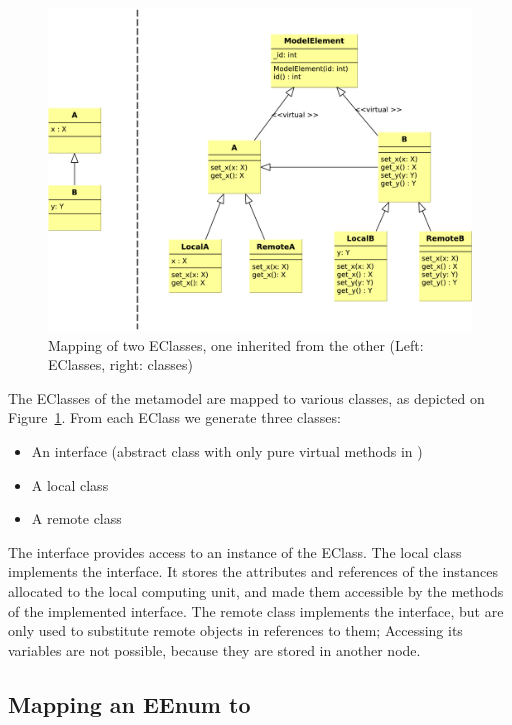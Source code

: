 \begin{figure}
	\begin{center}
		\includegraphics[width=\textwidth]{figures/eclass-to-cpp.pdf}
		\caption{Mapping of two EClasses, one inherited from the other (Left: EClasses, right: \protect\cpp{} classes) }
		\label{fig:eclass-to-cpp}
	\end{center}
\end{figure}


The EClasses of the metamodel are mapped to various \cpp{} classes, as depicted on \mbox{Figure~\ref{fig:eclass-to-cpp}}.
From each EClass we generate three \cpp{} classes:

\begin{itemize}
	\item An interface (abstract class with only pure virtual methods in \cpp{})
	\item A local class
	\item A remote class
\end{itemize}


The interface provides access to an instance of the EClass.
The local class implements the interface. It stores the attributes and references of the instances allocated to the local computing unit, and made them accessible by the methods of the implemented interface.
The remote class implements the interface, but are only used to substitute remote objects in references to them; 
Accessing its variables are not possible, because they are stored in another node. 

\subsection{Mapping an EEnum to \protect\cpp }


